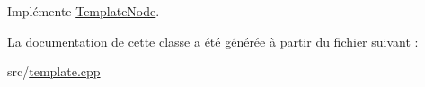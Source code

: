 Implémente \hyperlink{class_template_node_adb2714489a8bb9aee4fc97c0d16eb6f4}{Template\+Node}.



La documentation de cette classe a été générée à partir du fichier suivant \+:\begin{DoxyCompactItemize}
\item 
src/\hyperlink{template_8cpp}{template.\+cpp}\end{DoxyCompactItemize}
